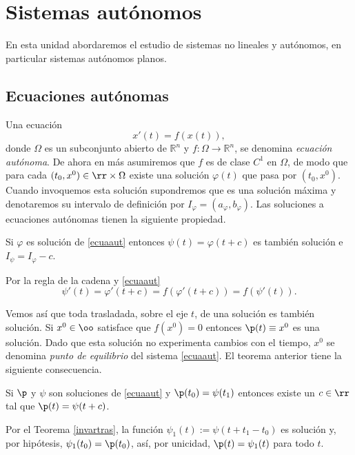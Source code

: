 \chapter{Sistemas autónomos}
En esta unidad abordaremos el estudio de  sistemas no lineales y
autónomos, en particular sistemas autónomos planos.
\section{Ecuaciones autónomas}

Una ecuación
\begin{equation}\label{ecuaaut}
    x'(t)=f(x(t)),
\end{equation}
donde $\Omega$ es un subconjunto abierto de $\mathbb{R}^n$ y $
f:\Omega\to\mathbb{R}^n$, se denomina \emph{ecuación autónoma}. De
ahora en más asumiremos que $f$ es de clase $C^1$ en $\Omega$, de
modo que para cada $(t_0,x^0)\in\rr\times\Omega$ existe una
solución $\varphi(t)$ que pasa por $(t_0,x^0)$. Cuando invoquemos
esta solución supondremos que es una solución máxima y denotaremos
su intervalo de definición por
$I_{\varphi}=(a_{\varphi},b_{\varphi})$. Las soluciones a
ecuaciones autónomas tienen la siguiente  propiedad.

\begin{teorema}\label{invartras} Si $\varphi$ es solución de \eqref{ecuaaut}
entonces $\psi(t)=\varphi(t+c)$ es también solución e
$I_{\psi}=I_{\varphi}-c$.
\end{teorema}
\begin{demo} Por la regla de la cadena y \eqref{ecuaaut}
\[
    \psi'(t)=\varphi'(t+c)=f(\varphi'(t+c))=f(\psi'(t)).
\]
\end{demo}
Vemos así que toda trasladada, sobre el eje $t$, de una solución
es también solución. Si $x^0\in\oo$ satisface que $f(x^0)=0$
entonces $\p(t)\equiv x^0$ es una solución. Dado que esta solución
no experimenta cambios con el tiempo, $x^0$ se denomina
\emph{punto de equilibrio} del sistema \eqref{ecuaaut}. El teorema
anterior tiene la siguiente consecuencia.

\begin{teorema}\label{orbitasnoencuentran} Si $\p$ y $\psi$ son soluciones de
\eqref{ecuaaut} y $\p(t_0)=\psi(t_1)$ entonces existe un $c\in\rr$
tal que $\p(t)=\psi(t+c)$.
\end{teorema}
\begin{demo} Por el Teorema \ref{invartras}, la función
$\psi_1(t):=\psi(t+t_1-t_0)$ es solución y, por hipótesis,
$\psi_1(t_0)=\p(t_0)$, así, por unicidad, $\p(t)=\psi_1(t)$ para
todo $t$. \end{demo}

